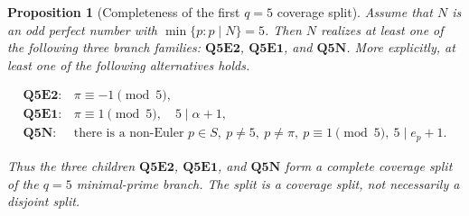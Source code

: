 \documentclass[11pt]{article}
\newtheorem{proposition}[theorem]{Proposition}
\theoremstyle{definition}
\theoremstyle{remark}
\begin{document}
\begin{proposition}[Completeness of the first \(q=5\) coverage split]
\label{prop:q5-first-input-three-child-coverage}
Assume that \(N\) is an odd perfect number with \(\min\{p:p\mid N\}=5\).
Then \(N\) realizes at least one of the following three branch families:
\(\mathbf{Q5E2}\), \(\mathbf{Q5E1}\), and \(\mathbf{Q5N}\).
More explicitly, at least one of the following alternatives holds.

\[
\begin{array}{ll}
\mathbf{Q5E2}: & \pi\equiv-1\pmod5,\\[2pt]
\mathbf{Q5E1}: & \pi\equiv1\pmod5,\quad 5\mid\alpha+1,\\[2pt]
\mathbf{Q5N}: &
\text{there is a non-Euler }p\in S,\ p\ne5,\ p\ne\pi,\ 
p\equiv1\pmod5,\ 5\mid e_p+1.
\end{array}
\]

Thus the three children \(\mathbf{Q5E2}\), \(\mathbf{Q5E1}\), and
\(\mathbf{Q5N}\) form a complete coverage split of the \(q=5\) minimal-prime
branch.  The split is a coverage split, not necessarily a disjoint split.
\end{proposition}
\end{document}
